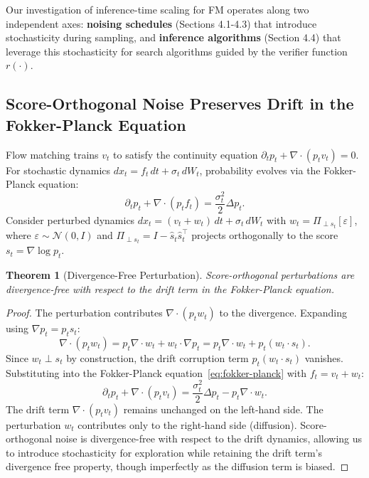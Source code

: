 \documentclass{article} %
\newtheorem{theorem}{Theorem}[section]
\newcommand{\rev}[1]{{\color{blue}#1}}
\begin{document}
Our investigation of inference-time scaling for FM operates along two independent axes: \textbf{noising schedules} (Sections \rev{4.1-4.3}) that introduce stochasticity during sampling, and \textbf{inference algorithms} (Section \rev{4.4}) that leverage this stochasticity for search algorithms guided by the verifier function \( r(\cdot) \).

\rev{
\subsection{Score-Orthogonal Noise Preserves Drift in the Fokker-Planck Equation}
\label{sec:fokker-planck}

Flow matching trains $v_t$ to satisfy the continuity equation $\partial_t p_t + \nabla \cdot (p_t v_t) = 0$. For stochastic dynamics $dx_t = f_t\, dt + \sigma_t\, dW_t$, probability evolves via the Fokker-Planck equation:
\begin{equation}
\label{eq:fokker-planck}
\partial_t p_t + \nabla \cdot (p_t f_t) = \frac{\sigma_t^2}{2} \Delta p_t.
\end{equation}
Consider perturbed dynamics $dx_t = (v_t + w_t)\, dt + \sigma_t\, dW_t$ with $w_t = \Pi_{\perp s_t}[\varepsilon]$, where $\varepsilon \sim \mathcal{N}(0, I)$ and $\Pi_{\perp s_t} = I - \hat{s}_t \hat{s}_t^\top$ projects orthogonally to the score $s_t = \nabla \log p_t$.

\begin{theorem}[Divergence-Free Perturbation]
\label{thm:score-orth}
Score-orthogonal perturbations are divergence-free with respect to the drift term in the Fokker-Planck equation.
\end{theorem}

\begin{proof}
The perturbation contributes $\nabla \cdot (p_t w_t)$ to the divergence. Expanding using $\nabla p_t = p_t s_t$:
\[
\nabla \cdot (p_t w_t) = p_t \nabla \cdot w_t + w_t \cdot \nabla p_t = p_t \nabla \cdot w_t + p_t (w_t \cdot s_t).
\]
Since $w_t \perp s_t$ by construction, the drift corruption term $p_t(w_t \cdot s_t)$ vanishes. Substituting into the Fokker-Planck equation~\eqref{eq:fokker-planck} with $f_t = v_t + w_t$:
\begin{equation}
\label{eq:fp-result}
\partial_t p_t + \nabla \cdot (p_t v_t) = \frac{\sigma_t^2}{2} \Delta p_t - p_t \nabla \cdot w_t.
\end{equation}
The drift term $\nabla \cdot (p_t v_t)$ remains unchanged on the left-hand side. The perturbation $w_t$ contributes only to the right-hand side (diffusion). Score-orthogonal noise is divergence-free with respect to the drift dynamics, allowing us to introduce stochasticity for exploration while retaining the drift term's divergence free property, though imperfectly as the diffusion term is biased. 
\end{proof}
}
\end{document}

